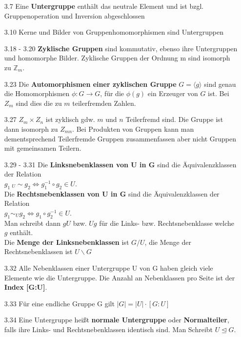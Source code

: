 \documentclass{scrartcl}
\begin{document}
\begin{itemize}
    \item [3.7] Eine \textbf{Untergruppe} enthält das neutrale Element und ist bzgl. Gruppenoperation und Inversion abgeschlossen

    \item [3.10] Kerne und Bilder von Gruppenhomomorphismen sind Untergruppen

    \item [3.18 - 3.20] \textbf{Zyklische Gruppen} sind kommutativ, ebenso ihre Untergruppen und homomorphe Bilder. Zyklische Gruppen der Ordnung m sind isomorph zu $\mathbb{Z}_m$.

    \item [3.23] Die \textbf{Automorphismen einer zyklischen Gruppe} $G = \langle g \rangle$ sind genau die Homomorphismen $\phi: G \to G$, für die $\phi(g)$ ein Erzeuger von $G$ ist. Bei $Z_m$ sind dies die zu $m$ teilerfremden Zahlen.

    \item [3.27] $Z_m \times Z_n$ ist zyklisch gdw. $m$ und $n$ Teilerfremd sind. Die Gruppe ist dann isomorph zu $Z_{mn}$. Bei Produkten von Gruppen kann man dementsprechend Teilerfremde Gruppen zusammenfassen aber nicht Gruppen mit gemeinsamen Teilern.
\pagebreak
    \item [3.29 - 3.31] Die \textbf{Linksnebenklassen von U in G} sind die Äquivalenzklassen der Relation\\ $g_{1} \ _{U} \sim g_2 \Leftrightarrow g_1^{-1} \circ g_2 \in U$.\\
    Die \textbf{Rechtsnebenklassen von U in G} sind die Äquivalenzklassen der Relation\\ $g_{1} \sim_{U} g_2 \Leftrightarrow g_1 \circ g_2^{-1} \in U$.\\
    Man schreibt dann $gU$ bzw. $Ug$ für die Links- bzw. Rechtsnebenklasse welche $g$ enthält. \\
    Die \textbf{Menge der Linksnebenklassen} ist $G/U$, die Menge der Rechtsnebenklassen ist $U\backslash G$

    \item [3.32] Alle Nebenklassen einer Untergruppe U von G haben gleich viele Elemente wie die Untergruppe. Die Anzahl an Nebenklassen pro Seite ist der \textbf{Index [G:U]}.

    \item [3.33] Für eine endliche Gruppe G gilt $|G| = |U| \cdot [G:U]$

    \item [3.34] Eine Untergruppe heißt \textbf{normale Untergruppe} oder \textbf{Normalteiler}, falls ihre Links- und Rechtsnebenklassen identisch sind. Man Schreibt $U \trianglelefteq G$.


\end{itemize}
\end{document}
